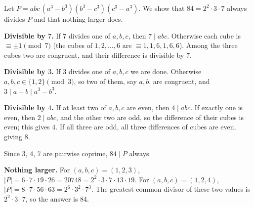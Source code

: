 Let $P=abc\,(a^3-b^3)(b^3-c^3)(c^3-a^3)$. We show that $84=2^2\cdot3\cdot7$ always divides $P$ and that nothing larger does.

\textbf{Divisible by $7$.} If $7$ divides one of $a,b,c$, then $7\mid abc$. Otherwise each cube is $\equiv\pm1\pmod 7$ (the cubes of $1,2,\dots,6$ are $\equiv1,1,6,1,6,6$). Among the three cubes two are congruent, and their difference is divisible by $7$.

\textbf{Divisible by $3$.} If $3$ divides one of $a,b,c$ we are done. Otherwise $a,b,c\in\{1,2\}\pmod 3$, so two of them, say $a,b$, are congruent, and $3\mid a-b\mid a^3-b^3$.

\textbf{Divisible by $4$.} If at least two of $a,b,c$ are even, then $4\mid abc$. If exactly one is even, then $2\mid abc$, and the other two are odd, so the difference of their cubes is even; this gives $4$. If all three are odd, all three differences of cubes are even, giving $8$.

Since $3$, $4$, $7$ are pairwise coprime, $84\mid P$ always.

\textbf{Nothing larger.} For $(a,b,c)=(1,2,3)$, $|P|=6\cdot7\cdot19\cdot26=20748=2^2\cdot3\cdot7\cdot13\cdot19$. For $(a,b,c)=(1,2,4)$, $|P|=8\cdot7\cdot56\cdot63=2^6\cdot3^2\cdot7^3$. The greatest common divisor of these two values is $2^2\cdot3\cdot7$, so the answer is $\boxed{84}$.

